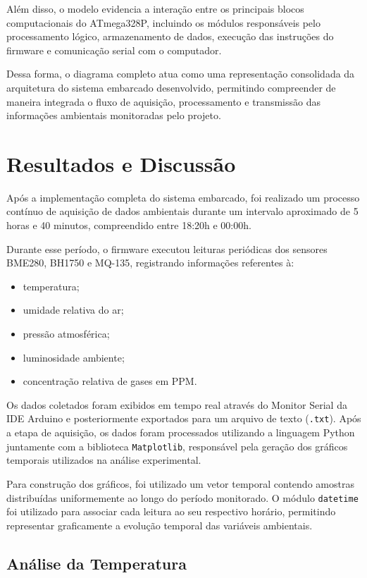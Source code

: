 \documentclass[a4paper,12pt]{article}
\begin{document}
Além disso, o modelo evidencia a interação entre os principais blocos computacionais do ATmega328P, incluindo os módulos responsáveis pelo processamento lógico, armazenamento de dados, execução das instruções do firmware e comunicação serial com o computador.

Dessa forma, o diagrama completo atua como uma representação consolidada da arquitetura do sistema embarcado desenvolvido, permitindo compreender de maneira integrada o fluxo de aquisição, processamento e transmissão das informações ambientais monitoradas pelo projeto.


\section{Resultados e Discussão}

Após a implementação completa do sistema embarcado, foi realizado um processo contínuo de aquisição de dados ambientais durante um intervalo aproximado de 5 horas e 40 minutos, compreendido entre 18:20h e 00:00h.

Durante esse período, o firmware executou leituras periódicas dos sensores BME280, BH1750 e MQ-135, registrando informações referentes à:
\begin{itemize}
\item temperatura;
\item umidade relativa do ar;
\item pressão atmosférica;
\item luminosidade ambiente;
\item concentração relativa de gases em PPM.
\end{itemize}

Os dados coletados foram exibidos em tempo real através do Monitor Serial da IDE Arduino e posteriormente exportados para um arquivo de texto (\texttt{.txt}). Após a etapa de aquisição, os dados foram processados utilizando a linguagem Python juntamente com a biblioteca \texttt{Matplotlib}, responsável pela geração dos gráficos temporais utilizados na análise experimental.

Para construção dos gráficos, foi utilizado um vetor temporal contendo amostras distribuídas uniformemente ao longo do período monitorado. O módulo \texttt{datetime} foi utilizado para associar cada leitura ao seu respectivo horário, permitindo representar graficamente a evolução temporal das variáveis ambientais.

\subsection{Análise da Temperatura}
\end{document}
